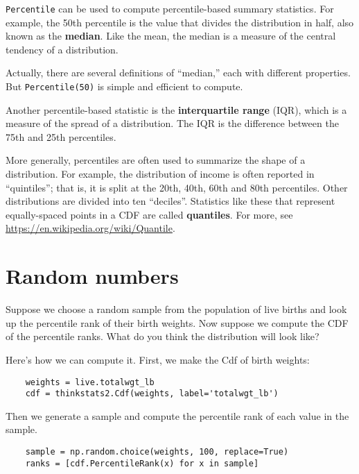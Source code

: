 {\tt Percentile} can be used to compute percentile-based summary
statistics.  For example, the 50th percentile is the value that
divides the distribution in half, also known as the {\bf median}.
Like the mean, the median is a measure of the central tendency
of a distribution.

Actually, there are several definitions of ``median,'' each with
different properties.  But {\tt Percentile(50)} is simple and
efficient to compute.

Another percentile-based statistic is the {\bf interquartile range} (IQR),
which is a measure of the spread of a distribution.  The IQR
is the difference between the 75th and 25th percentiles.

More generally, percentiles are often used to summarize the shape
of a distribution.  For example, the distribution of income is
often reported in ``quintiles''; that is, it is split at the
20th, 40th, 60th and 80th percentiles.  Other distributions
are divided into ten ``deciles''.  Statistics like these that represent
equally-spaced points in a CDF are called {\bf quantiles}.
For more, see \url{https://en.wikipedia.org/wiki/Quantile}.



\section{Random numbers}
\label{random}

Suppose we choose a random sample from the population of live
births and look up the percentile rank of their birth weights.
Now suppose we compute the CDF of the percentile ranks.  What do
you think the distribution will look like?

Here's how we can compute it.  First, we make the Cdf of
birth weights:

\begin{verbatim}
    weights = live.totalwgt_lb
    cdf = thinkstats2.Cdf(weights, label='totalwgt_lb')
\end{verbatim}

Then we generate a sample and compute the percentile rank of
each value in the sample.

\begin{verbatim}
    sample = np.random.choice(weights, 100, replace=True)
    ranks = [cdf.PercentileRank(x) for x in sample]
\end{verbatim}

